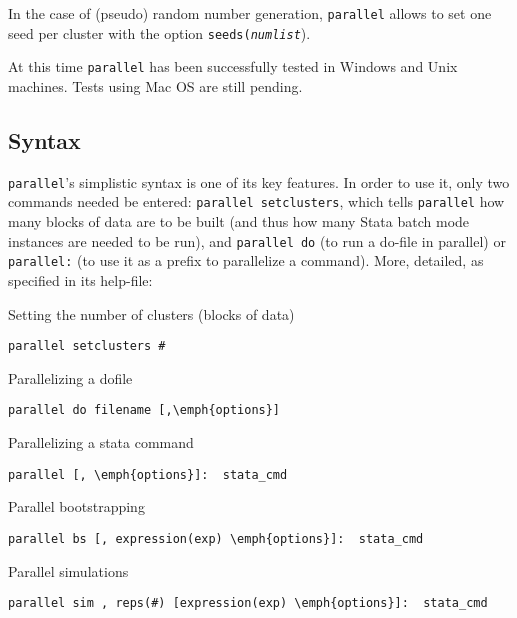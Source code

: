 \documentclass[letterpaper, 10pt]{article}
\begin{document}
In the case of (pseudo) random number generation, {\tt parallel} allows to set one seed per cluster with the option {\tt seeds(\it{numlist}}).

At this time {\tt parallel} has been successfully tested in Windows and Unix machines. Tests using Mac OS are still pending.

\subsection{Syntax}

{\tt parallel}'s simplistic syntax is one of its key features. In order to use it, only two commands needed be entered: {\tt parallel setclusters}, which tells {\tt parallel} how many blocks of data are to be built (and thus how many Stata batch mode instances are needed to be run), and {\tt parallel do} (to run a do-file in parallel) or {\tt parallel:} (to use it as a prefix to parallelize a command). More, detailed, as specified in its help-file:

Setting the number of clusters (blocks of data)

\begin{verbatim}
parallel setclusters #
\end{verbatim}

Parallelizing a dofile

\begin{Verbatim}[commandchars=\\\{\}]
parallel do filename [,\emph{options}]
\end{Verbatim}

Parallelizing a stata command

\begin{Verbatim}[commandchars=\\\{\}]
parallel [, \emph{options}]:  stata_cmd
\end{Verbatim}

Parallel bootstrapping

\begin{Verbatim}[commandchars=\\\{\}]
parallel bs [, expression(exp) \emph{options}]:  stata_cmd
\end{Verbatim}

Parallel simulations

\begin{Verbatim}[commandchars=\\\{\}]
parallel sim , reps(#) [expression(exp) \emph{options}]:  stata_cmd
\end{Verbatim}
\end{document}
